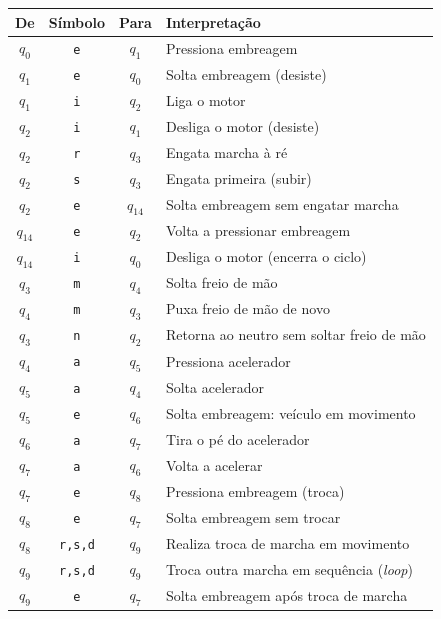 \documentclass[12pt,a4paper]{article}
\begin{document}
\begin{center}
\small
\begin{longtable}{|c|c|c|l|}
    \hline
    \textbf{De} & \textbf{Símbolo} & \textbf{Para} & \textbf{Interpretação} \\
    \hline
    \endhead
    $q_0$    & \texttt{e} & $q_1$    & Pressiona embreagem \\
    $q_1$    & \texttt{e} & $q_0$    & Solta embreagem (desiste) \\
    $q_1$    & \texttt{i} & $q_2$    & Liga o motor \\
    $q_2$    & \texttt{i} & $q_1$    & Desliga o motor (desiste) \\
    $q_2$    & \texttt{r} & $q_3$    & Engata marcha à ré \\
    $q_2$    & \texttt{s} & $q_3$    & Engata primeira (subir) \\
    $q_2$    & \texttt{e} & $q_{14}$ & Solta embreagem sem engatar marcha \\
    $q_{14}$ & \texttt{e} & $q_2$    & Volta a pressionar embreagem \\
    $q_{14}$ & \texttt{i} & $q_0$    & Desliga o motor (encerra o ciclo) \\
    $q_3$    & \texttt{m} & $q_4$    & Solta freio de mão \\
    $q_4$    & \texttt{m} & $q_3$    & Puxa freio de mão de novo \\
    $q_3$    & \texttt{n} & $q_2$    & Retorna ao neutro sem soltar freio de mão \\
    $q_4$    & \texttt{a} & $q_5$    & Pressiona acelerador \\
    $q_5$    & \texttt{a} & $q_4$    & Solta acelerador \\
    $q_5$    & \texttt{e} & $q_6$    & Solta embreagem: veículo em movimento \\
    $q_6$    & \texttt{a} & $q_7$    & Tira o pé do acelerador \\
    $q_7$    & \texttt{a} & $q_6$    & Volta a acelerar \\
    $q_7$    & \texttt{e} & $q_8$    & Pressiona embreagem (troca) \\
    $q_8$    & \texttt{e} & $q_7$    & Solta embreagem sem trocar \\
    $q_8$    & \texttt{r,s,d} & $q_9$ & Realiza troca de marcha em movimento \\
    $q_9$    & \texttt{r,s,d} & $q_9$ & Troca outra marcha em sequência (\emph{loop}) \\
    $q_9$    & \texttt{e} & $q_7$    & Solta embreagem após troca de marcha \\

\end{longtable}
\end{center}
\end{document}
